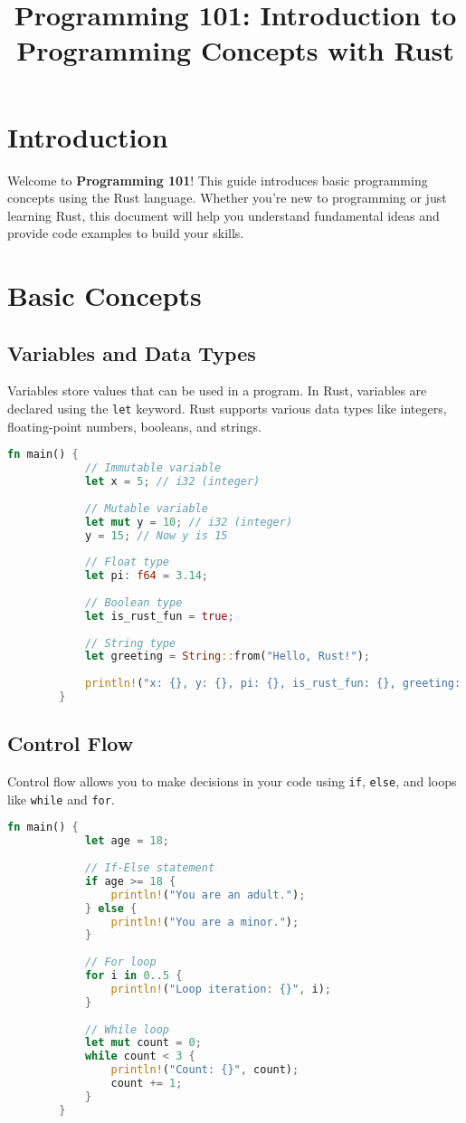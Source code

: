 \documentclass{article}
\title{Programming 101: Introduction to Programming Concepts with Rust}
\author{}
\date{}
\begin{document}
	
	\maketitle
	
	\section*{Introduction}
	Welcome to \textbf{Programming 101}! This guide introduces basic programming concepts using the Rust language. Whether you’re new to programming or just learning Rust, this document will help you understand fundamental ideas and provide code examples to build your skills.
	
	\section*{Basic Concepts}
	\subsection*{Variables and Data Types}
	Variables store values that can be used in a program. In Rust, variables are declared using the \texttt{let} keyword. Rust supports various data types like integers, floating-point numbers, booleans, and strings.
	
	\begin{lstlisting}[language=Rust, caption={Variable declaration and data types in Rust}]
		fn main() {
			// Immutable variable
			let x = 5; // i32 (integer)
			
			// Mutable variable
			let mut y = 10; // i32 (integer)
			y = 15; // Now y is 15
			
			// Float type
			let pi: f64 = 3.14;
			
			// Boolean type
			let is_rust_fun = true;
			
			// String type
			let greeting = String::from("Hello, Rust!");
			
			println!("x: {}, y: {}, pi: {}, is_rust_fun: {}, greeting: {}", x, y, pi, is_rust_fun, greeting);
		}
	\end{lstlisting}
	\newpage
	\subsection*{Control Flow}
	Control flow allows you to make decisions in your code using \texttt{if}, \texttt{else}, and loops like \texttt{while} and \texttt{for}.
	
	\begin{lstlisting}[language=Rust, caption={If statements and loops}]
		fn main() {
			let age = 18;
			
			// If-Else statement
			if age >= 18 {
				println!("You are an adult.");
			} else {
				println!("You are a minor.");
			}
			
			// For loop
			for i in 0..5 {
				println!("Loop iteration: {}", i);
			}
			
			// While loop
			let mut count = 0;
			while count < 3 {
				println!("Count: {}", count);
				count += 1;
			}
		}
	\end{lstlisting}
	
\end{document}
